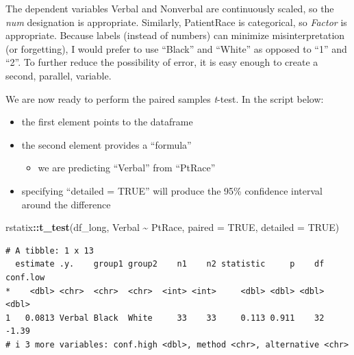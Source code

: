 \documentclass[
  11pt,
]{book}
\newenvironment{Shaded}{\begin{snugshade}}{\end{snugshade}}
\newcommand{\AttributeTok}[1]{\textcolor[rgb]{0.27,0.27,0.27}{#1}}
\newcommand{\ConstantTok}[1]{\textcolor[rgb]{0.37,0.37,0.37}{#1}}
\newcommand{\DecValTok}[1]{\textcolor[rgb]{0.06,0.06,0.06}{#1}}
\newcommand{\FunctionTok}[1]{\textcolor[rgb]{0.27,0.27,0.27}{\textbf{#1}}}
\newcommand{\NormalTok}[1]{#1}
\newcommand{\OtherTok}[1]{\textcolor[rgb]{0.37,0.37,0.37}{#1}}
\newcommand{\SpecialCharTok}[1]{\textcolor[rgb]{0.43,0.43,0.43}{\textbf{#1}}}
\newcommand{\StringTok}[1]{\textcolor[rgb]{0.5,0.5,0.5}{#1}}
\providecommand{\tightlist}{%
  \setlength{\itemsep}{0pt}\setlength{\parskip}{0pt}}
\begin{document}
The dependent variables Verbal and Nonverbal are continuously scaled, so the \emph{num} designation is appropriate. Similarly, PatientRace is categorical, so \emph{Factor} is appropriate. Because labels (instead of numbers) can minimize misinterpretation (or forgetting), I would prefer to use ``Black'' and ``White'' as opposed to ``1'' and ``2''. To further reduce the possibility of error, it is easy enough to create a second, parallel, variable.

\begin{Shaded}
\end{Shaded}

We are now ready to perform the paired samples \emph{t}-test. In the script below:

\begin{itemize}
\tightlist
\item
  the first element points to the dataframe
\item
  the second element provides a ``formula''

  \begin{itemize}
  \tightlist
  \item
    we are predicting ``Verbal'' from ``PtRace''
  \end{itemize}
\item
  specifying ``detailed = TRUE'' will produce the 95\% confidence interval around the difference
\end{itemize}

\begin{Shaded}
\begin{Highlighting}[]
\NormalTok{rstatix}\SpecialCharTok{::}\FunctionTok{t\_test}\NormalTok{(df\_long, Verbal }\SpecialCharTok{\textasciitilde{}}\NormalTok{ PtRace, }\AttributeTok{paired =} \ConstantTok{TRUE}\NormalTok{, }\AttributeTok{detailed =} \ConstantTok{TRUE}\NormalTok{)}
\end{Highlighting}
\end{Shaded}

\begin{verbatim}
# A tibble: 1 x 13
  estimate .y.    group1 group2    n1    n2 statistic     p    df conf.low
*    <dbl> <chr>  <chr>  <chr>  <int> <int>     <dbl> <dbl> <dbl>    <dbl>
1   0.0813 Verbal Black  White     33    33     0.113 0.911    32    -1.39
# i 3 more variables: conf.high <dbl>, method <chr>, alternative <chr>
\end{verbatim}
\end{document}
